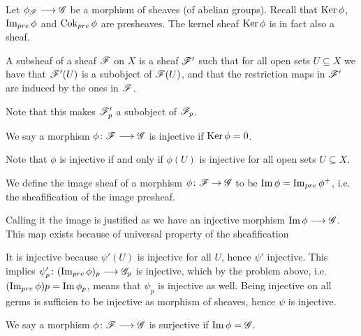 Let $\phi_{\mathscr{F}}\longrightarrow \mathscr{G}$ be a morphism of sheaves (of abelian groups). Recall that $\operatorname{Ker}\phi$, $\operatorname{Im}_{pre}\phi$ and $\operatorname{Cok}_{pre}\phi$ are presheaves. The kernel sheaf $\operatorname{Ker}\phi$ is in fact also a sheaf. 

\begin{definition}
A subsheaf of a sheaf $\mathscr{F}$ on $X$ is a sheaf $\mathscr{F}'$ such that for all open sets $U\subseteq X$ we have that $\mathscr{F}'(U)$ is a subobject of $\mathscr{F}(U)$, and that the restriction maps in $\mathscr{F}'$ are induced by the ones in $\mathscr{F}$. 
\end{definition}
Note that this makes $\mathscr{F}'_p$ a subobject of $\mathscr{F}_p$. 

\begin{definition}
We say a morphism $\phi\colon\mathscr{F}\longrightarrow\mathscr{G}$ is injective if $\operatorname{Ker}\phi=0$. 
\end{definition}
Note that $\phi$ is injective if and only if $\phi(U)$ is injective for all open sets $U\subseteq X$. 

\begin{definition}
We define the image sheaf of a morphism $\phi\colon\mathscr{F}\rightarrow\mathscr{G}$ to be $\operatorname{Im}\phi = \operatorname{Im}_{pre}\phi^+$, i.e. the sheafification of the image presheaf. 
\end{definition}
Calling it the image is justified as we have an injective morphism $\operatorname{Im}\phi\longrightarrow\mathscr{G}$. This map exists because of universal property of the sheafification
\begin{center}
\end{center}
It is injective because $\psi'(U)$ is injective for all $U$, hence $\psi'$ injective. This implies $\psi'_p\colon(\operatorname{Im}_{pre}\phi)_p\longrightarrow \mathscr{G}_p$ is injective, which by the problem above, i.e. $(\operatorname{Im}_{pre}\phi)p = \operatorname{Im}\phi_p$, means that $\psi_p$ is injective as well. Being injective on all germs is sufficien to be injective as morphism of sheaves, hence $\psi$ is injective. 

\begin{definition}
We say a morphism $\phi\colon\mathscr{F}\longrightarrow\mathscr{G}$ is surjective if $\operatorname{Im}\phi = \mathscr{G}$. 
\end{definition}

